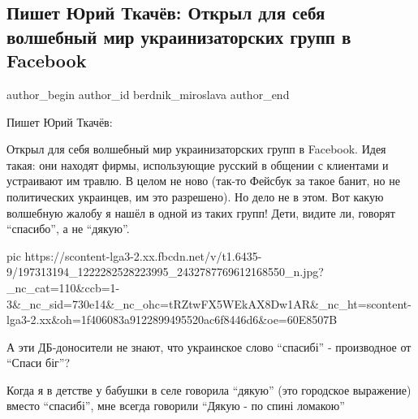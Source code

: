  
 
 
 
 
 
\subsection{Пишет Юрий Ткачёв: Открыл для себя волшебный мир украинизаторских групп в Facebook}
\label{sec:09_06_2021.fb.berdnik_miroslava.1.facebook_ukrainizacia}
\ifcmt
 author_begin
   author_id berdnik_miroslava
 author_end
\fi

Пишет Юрий Ткачёв:

Открыл для себя волшебный мир украинизаторских групп в Facebook. Идея такая:
они находят фирмы, использующие русский в общении с клиентами и устраивают им
травлю. В целом не ново (так-то Фейсбук за такое банит, но не политических
украинцев, им это разрешено).  Но дело не в этом.  Вот какую волшебную жалобу я
нашёл в одной из таких групп! Дети, видите ли, говорят \enquote{спасибо}, а не
\enquote{дякую}. 

\ifcmt
  pic https://scontent-lga3-2.xx.fbcdn.net/v/t1.6435-9/197313194_1222282528223995_2432787769612168550_n.jpg?_nc_cat=110&ccb=1-3&_nc_sid=730e14&_nc_ohc=tRZtwFX5WEkAX8Dw1AR&_nc_ht=scontent-lga3-2.xx&oh=1f406083a9122899495520ac6f8446d6&oe=60E8507B
\fi

А эти ДБ-доносители не знают, что украинское слово \enquote{спасибі} -
производное от \enquote{Спаси біг}?

Когда я в детстве у бабушки в селе говорила \enquote{дякую} (это городское
выражение) вместо  \enquote{спасибі}, мне всегда говорили \enquote{Дякую - по
спині ломакою}
